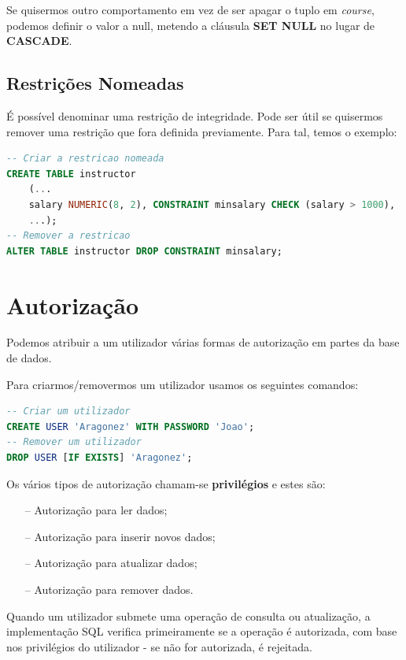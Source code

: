 \documentclass[oneside]{book}
\theoremstyle{definition}
\begin{document}
Se quisermos outro comportamento em vez de ser apagar o tuplo em \textit{course}, podemos definir o valor a null, metendo a cláusula \textbf{SET NULL} no lugar de \textbf{CASCADE}.

\subsection{Restrições Nomeadas}
É possível denominar uma restrição de integridade. Pode ser útil se quisermos remover uma restrição que fora definida previamente.
Para tal, temos o exemplo:
\begin{lstlisting}[language=SQL, morekeywords={REFERENCES, REFRESH, MATERIALIZED, CONCURRENTLY}, framesep=8pt, xleftmargin=40pt, framexleftmargin=40pt, frame=tb, framerule=0pt]
-- Criar a restricao nomeada
CREATE TABLE instructor
    (...
    salary NUMERIC(8, 2), CONSTRAINT minsalary CHECK (salary > 1000),
    ...);
-- Remover a restricao
ALTER TABLE instructor DROP CONSTRAINT minsalary;
\end{lstlisting}

\section{Autorização}
Podemos atribuir a um utilizador várias formas de autorização em partes da base de dados. 

Para criarmos/removermos um utilizador usamos os seguintes comandos:
\begin{lstlisting}[language=SQL, morekeywords={REFERENCES, REFRESH, MATERIALIZED, CONCURRENTLY}, framesep=8pt, xleftmargin=40pt, framexleftmargin=40pt, frame=tb, framerule=0pt]
-- Criar um utilizador
CREATE USER 'Aragonez' WITH PASSWORD 'Joao';
-- Remover um utilizador
DROP USER [IF EXISTS] 'Aragonez';
\end{lstlisting}

Os vários tipos de autorização chamam-se \textbf{privilégios} e estes são:
\begin{itemize}
    \itemsep0cm
    \item[--] Autorização para ler dados;
    \item[--] Autorização para inserir novos dados;
    \item[--] Autorização para atualizar dados;
    \item[--] Autorização para remover dados.
\end{itemize}
Quando um utilizador submete uma operação de consulta ou atualização, a implementação SQL verifica primeiramente se a operação é autorizada, com base nos privilégios do utilizador - se não for autorizada, é rejeitada.
\end{document}

